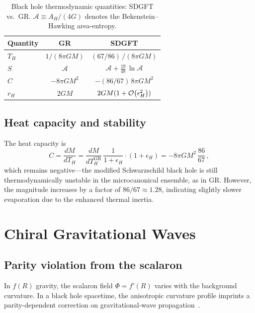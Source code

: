 \documentclass[amsmath,amssymb,aps,prd,twocolumn,superscriptaddress,nofootinbib]{revtex4-2}
\begin{document}
\begin{table}[t]
\centering
\caption{Black hole thermodynamic quantities: SDGFT vs.\ GR.
$\mathcal{A} \equiv A_H/(4G)$ denotes the Bekenstein--Hawking
area-entropy.}
\label{tab:thermo}
\begin{tabular}{@{}lcc@{}}
\toprule
Quantity & GR & SDGFT \\
\midrule
$T_H$ & $1/(8\pi GM)$ & $(67/86)\,/(8\pi GM)$ \\
$S$ & $\mathcal{A}$ & $\mathcal{A} + \tfrac{19}{48}\,\ln\mathcal{A}$ \\
$C$ & $-8\pi G M^2$ & $-(86/67)\,8\pi G M^2$ \\
$r_H$ & $2GM$ & $2GM(1 + \mathcal{O}\!\left(\epsilon_H^2\right))$ \\
\bottomrule
\end{tabular}
\end{table}

\subsection{Heat capacity and stability}

The heat capacity is
\begin{equation}
  C = \frac{dM}{dT_H}
    = \frac{d M}{d T_H^{\mathrm{GR}}}\,\frac{1}{1+\epsilon_H}
    \cdot (1 + \epsilon_H)
    = -8\pi G M^2\,\frac{86}{67}\,,
  \label{eq:heat_capacity}
\end{equation}
which remains negative---the modified Schwarzschild black hole is
still thermodynamically unstable in the microcanonical ensemble,
as in GR.  However, the magnitude increases by a factor of $86/67
\approx 1.28$, indicating slightly slower evaporation due to the
enhanced thermal inertia.

\section{Chiral Gravitational Waves}
\label{sec:chiral}

\subsection{Parity violation from the scalaron}

In $f(R)$ gravity, the scalaron field $\Phi = f'(R)$ varies with
the background curvature.  In a black hole spacetime, the
anisotropic curvature profile imprints a parity-dependent correction
on gravitational-wave propagation~\cite{Alexander2009,Yunes2009}.
\end{document}
